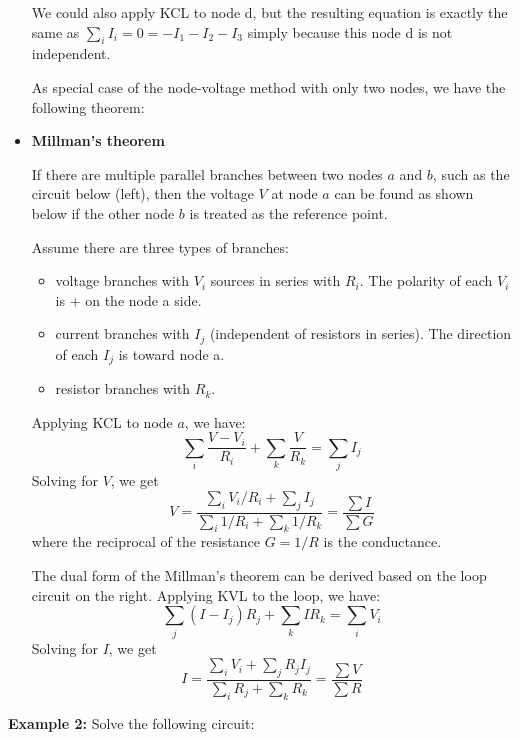 \begin{itemize}
  We could also apply KCL to node d, but the resulting equation is exactly
  the same as $\sum_i I_i=0=-I_1-I_2-I_3$ simply because this node d is not 
  independent.

  As special case of the node-voltage method with only two nodes, we have the
  following theorem:


\item {\bf Millman's theorem} 

  If there are multiple parallel branches between two nodes $a$ and $b$, 
  such as the circuit below (left), then the voltage $V$ at node $a$ can 
  be found as shown below if the other node $b$ is treated as the reference 
  point.

  Assume there are three types of branches:
  \begin{itemize}
  \item voltage branches with $V_i$ sources in series with $R_i$. The
    polarity of each $V_i$ is + on the node a side.
  \item current branches with $I_j$ (independent of resistors in series).
    The direction of each $I_j$ is toward node a.
  \item resistor branches with $R_k$.
  \end{itemize}

  Applying KCL to node $a$, we have:
  \[ 
  \sum_i \frac{V-V_i}{R_i}+\sum_k \frac{V}{R_k}=\sum_j I_j
  \]
  Solving for $V$, we get
  \[ 
  V=\frac{\sum_i V_i/R_i+\sum_j I_j}{\sum_i 1/R_i+\sum_k 1/R_k}=\frac{\sum I}{\sum G} 
  \]
  where the reciprocal of the resistance $G=1/R$ is the conductance.


  The dual form of the Millman's theorem can be derived based on the
  loop circuit on the right. Applying KVL to the loop, we have:
  \[ 
  \sum_j (I-I_j)R_j+\sum_k I R_k=\sum_i V_i
  \]
  Solving for $I$, we get
  \[ 
  I=\frac{\sum_i V_i+\sum_j R_jI_j}{\sum_i R_j+\sum_k R_k}=\frac{\sum V}{\sum R} 
  \]

\end{itemize}


{\bf Example 2:} Solve the following circuit:


